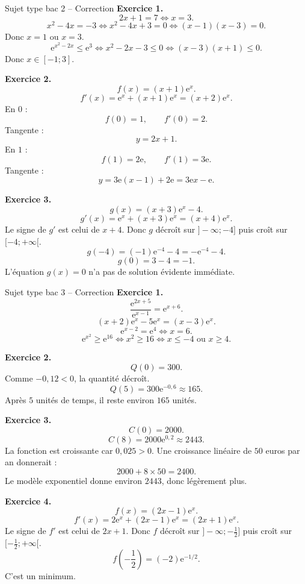 \documentclass[11pt,a4paper]{article}
\newcommand{\e}{\mathrm{e}}
\begin{document}
\begin{correctionbox}{Sujet type bac 2 -- Correction}
\textbf{Exercice 1.}
\[
2x+1=7 \Longleftrightarrow x=3.
\]
\[
x^2-4x=-3
\Longleftrightarrow x^2-4x+3=0
\Longleftrightarrow (x-1)(x-3)=0.
\]
Donc $x=1$ ou $x=3$.
\[
\e^{x^2-2x}\leq\e^3
\Longleftrightarrow x^2-2x-3\leq0
\Longleftrightarrow (x-3)(x+1)\leq0.
\]
Donc $x\in[-1;3]$.

\medskip

\textbf{Exercice 2.}
\[
f(x)=(x+1)\e^x.
\]
\[
f'(x)=\e^x+(x+1)\e^x=(x+2)\e^x.
\]
En $0$ :
\[
f(0)=1,
\qquad
f'(0)=2.
\]
Tangente :
\[
y=2x+1.
\]
En $1$ :
\[
f(1)=2\e,
\qquad
f'(1)=3\e.
\]
Tangente :
\[
y=3\e(x-1)+2\e=3\e x-\e.
\]

\medskip

\textbf{Exercice 3.}
\[
g(x)=(x+3)\e^x-4.
\]
\[
g'(x)=\e^x+(x+3)\e^x=(x+4)\e^x.
\]
Le signe de $g'$ est celui de $x+4$. Donc $g$ décroît sur $]-\infty;-4]$ puis croît sur $[-4;+\infty[$.
\[
g(-4)=(-1)\e^{-4}-4=-\e^{-4}-4.
\]
\[
g(0)=3-4=-1.
\]
L'équation $g(x)=0$ n'a pas de solution évidente immédiate.
\end{correctionbox}

\begin{correctionbox}{Sujet type bac 3 -- Correction}
\textbf{Exercice 1.}
\[
\frac{\e^{2x+5}}{\e^{x-1}}=\e^{x+6}.
\]
\[
(x+2)\e^x-5\e^x=(x-3)\e^x.
\]
\[
\e^{x-2}=\e^4 \Longleftrightarrow x=6.
\]
\[
\e^{x^2}\geq\e^{16}
\Longleftrightarrow x^2\geq16
\Longleftrightarrow x\leq -4 \text{ ou } x\geq4.
\]

\medskip

\textbf{Exercice 2.}
\[
Q(0)=300.
\]
Comme $-0,12<0$, la quantité décroît.
\[
Q(5)=300\e^{-0,6}\approx165.
\]
Après $5$ unités de temps, il reste environ $165$ unités.

\medskip

\textbf{Exercice 3.}
\[
C(0)=2000.
\]
\[
C(8)=2000\e^{0,2}\approx2443.
\]
La fonction est croissante car $0,025>0$.
Une croissance linéaire de $50$ euros par an donnerait :
\[
2000+8\times50=2400.
\]
Le modèle exponentiel donne environ $2443$, donc légèrement plus.

\medskip

\textbf{Exercice 4.}
\[
f(x)=(2x-1)\e^x.
\]
\[
f'(x)=2\e^x+(2x-1)\e^x=(2x+1)\e^x.
\]
Le signe de $f'$ est celui de $2x+1$.
Donc $f$ décroît sur $]-\infty;-\frac12]$ puis croît sur $[-\frac12;+\infty[$.
\[
f\left(-\frac12\right)=(-2)\e^{-1/2}.
\]
C'est un minimum.
\end{correctionbox}
\end{document}
